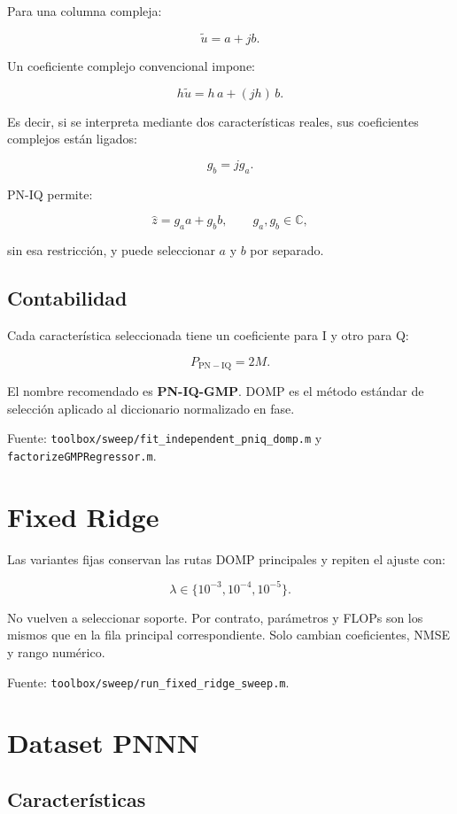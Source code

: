 \documentclass[10pt,a4paper]{article}
\newcommand{\code}[1]{\texttt{#1}}
\newcommand{\C}{\mathbb{C}}
\begin{document}
Para una columna compleja:

\[
\widetilde u=a+jb.
\]

Un coeficiente complejo convencional impone:

\[
h\widetilde u=h\,a+(jh)\,b.
\]

Es decir, si se interpreta mediante dos características reales, sus
coeficientes complejos están ligados:

\[
g_b=jg_a.
\]

PN-IQ permite:

\[
\hat z=g_a a+g_b b,
\qquad
g_a,g_b\in\C,
\]

sin esa restricción, y puede seleccionar \(a\) y \(b\) por separado.

\subsection{Contabilidad}

Cada característica seleccionada tiene un coeficiente para I y otro para Q:

\[
P_{\mathrm{PN-IQ}}=2M.
\]

El nombre recomendado es \textbf{PN-IQ-GMP}. DOMP es el método estándar
de selección aplicado al diccionario normalizado en fase.

Fuente: \code{toolbox/sweep/fit\_independent\_pniq\_domp.m} y
\code{factorizeGMPRegressor.m}.

\section{Fixed Ridge}

Las variantes fijas conservan las rutas DOMP principales y repiten el ajuste
con:

\[
\lambda\in\{10^{-3},10^{-4},10^{-5}\}.
\]

No vuelven a seleccionar soporte. Por contrato, parámetros y FLOPs son los
mismos que en la fila principal correspondiente. Solo cambian coeficientes,
NMSE y rango numérico.

Fuente: \code{toolbox/sweep/run\_fixed\_ridge\_sweep.m}.

\section{Dataset PNNN}

\subsection{Características}
\end{document}
